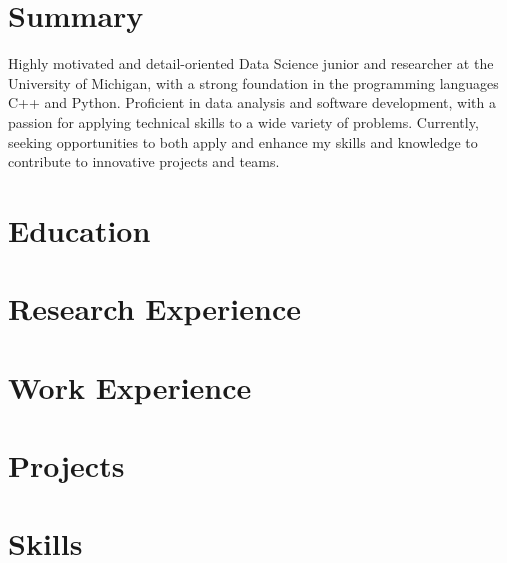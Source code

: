 \documentclass{resume}
\begin{document}
\section{Summary}
Highly motivated and detail-oriented Data Science junior and researcher at the University of Michigan, with a strong foundation in the programming languages C++ and Python. Proficient in data analysis and software development, with a passion for applying technical skills to a wide variety of problems. Currently, seeking opportunities to both apply and enhance my skills and knowledge to contribute to innovative projects and teams.

\section{Education}



\section{Research Experience}



\section{Work Experience}





\section{Projects}


















\section{Skills}

\end{document}
